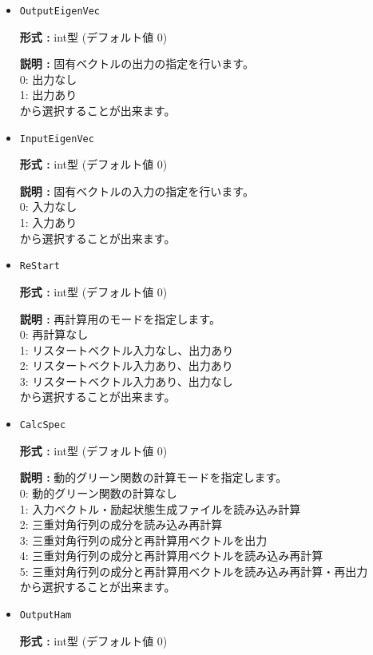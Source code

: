 \begin{itemize}
\item  \verb|OutputEigenVec|

{\bf 形式 :} {int型 (デフォルト値 0)}

{\bf 説明 :} {固有ベクトルの出力の指定を行います。\\
0: 出力なし\\
1: 出力あり\\
から選択することが出来ます。}

\item  \verb|InputEigenVec|

{\bf 形式 :} {int型 (デフォルト値 0)}

{\bf 説明 :} {固有ベクトルの入力の指定を行います。\\
0: 入力なし\\
1: 入力あり\\
から選択することが出来ます。}

\item  \verb|ReStart|

{\bf 形式 :} {int型 (デフォルト値 0)}

{\bf 説明 :} {
{
再計算用のモードを指定します。\\
0: 再計算なし\\
1: リスタートベクトル入力なし、出力あり\\
2: リスタートベクトル入力あり、出力あり\\
3: リスタートベクトル入力あり、出力なし\\
から選択することが出来ます。
}
}

\item  \verb|CalcSpec|

{\bf 形式 :} {int型 (デフォルト値 0)}

{\bf 説明 :} {
{
動的グリーン関数の計算モードを指定します。\\
0: 動的グリーン関数の計算なし\\
1: 入力ベクトル・励起状態生成ファイルを読み込み計算\\
2: 三重対角行列の成分を読み込み再計算\\
3: 三重対角行列の成分と再計算用ベクトルを出力\\
4: 三重対角行列の成分と再計算用ベクトルを読み込み再計算\\
5: 三重対角行列の成分と再計算用ベクトルを読み込み再計算・再出力\\
から選択することが出来ます。}
}

\item  \verb|OutputHam|

{\bf 形式 :} {int型 (デフォルト値 0)}


\end{itemize}
